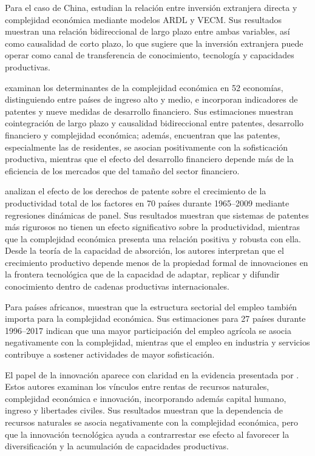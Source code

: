 \documentclass[../../PTFM.tex]{subfiles}
\begin{document}
	Para el caso de China, \textcite{Khan2020} estudian la relación entre inversión extranjera directa y complejidad económica mediante modelos ARDL y VECM. Sus resultados muestran una relación bidireccional de largo plazo entre ambas variables, así como causalidad de corto plazo, lo que sugiere que la inversión extranjera puede operar como canal de transferencia de conocimiento, tecnología y capacidades productivas. 

	\textcite{Nguyen2020} examinan los determinantes de la complejidad económica en 52 economías, distinguiendo entre países de ingreso alto y medio, e incorporan indicadores de patentes y nueve medidas de desarrollo financiero. Sus estimaciones muestran cointegración de largo plazo y causalidad bidireccional entre patentes, desarrollo financiero y complejidad económica; además, encuentran que las patentes, especialmente las de residentes, se asocian positivamente con la sofisticación productiva, mientras que el efecto del desarrollo financiero depende más de la eficiencia de los mercados que del tamaño del sector financiero.

	\textcite{Sweet2019} analizan el efecto de los derechos de patente sobre el crecimiento de la productividad total de los factores en 70 países durante 1965--2009 mediante regresiones dinámicas de panel. Sus resultados muestran que sistemas de patentes más rigurosos no tienen un efecto significativo sobre la productividad, mientras que la complejidad económica presenta una relación positiva y robusta con ella. Desde la teoría de la capacidad de absorción, los autores interpretan que el crecimiento productivo depende menos de la propiedad formal de innovaciones en la frontera tecnológica que de la capacidad de adaptar, replicar y difundir conocimiento dentro de cadenas productivas internacionales.

	Para países africanos, \textcite{KetuNingaye2024} muestran que la estructura sectorial del empleo también importa para la complejidad económica. Sus estimaciones para 27 países durante 1996--2017 indican que una mayor participación del empleo agrícola se asocia negativamente con la complejidad, mientras que el empleo en industria y servicios contribuye a sostener actividades de mayor sofisticación.
	
	El papel de la innovación aparece con claridad en la evidencia presentada por \textcite{Alvarado2023}. Estos autores examinan los vínculos entre rentas de recursos naturales, complejidad económica e innovación, incorporando además capital humano, ingreso y libertades civiles. Sus resultados muestran que la dependencia de recursos naturales se asocia negativamente con la complejidad económica, pero que la innovación tecnológica ayuda a contrarrestar ese efecto al favorecer la diversificación y la acumulación de capacidades productivas.
	
\end{document}
